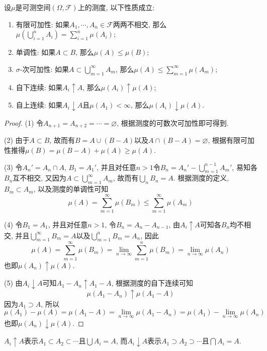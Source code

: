 \documentclass[cn, 12pt, math=mtpro2, bibstyle=apa, blue, twocol]{elegantbook}
\newcommand{\F}{\mathcal{F}}
\newcommand{\limn}{\lim_{n\to\infty}}
\let\emptyset\varnothing
\begin{document}
\begin{theorem}\label{thm:thm1.2}
  设$\mu$是可测空间$(\Omega,\F)$上的测度, 以下性质成立:
  \begin{enumerate}[label=(\arabic*)]
    \item 有限可加性: 如果$A_1,\cdots,A_n\in\F$两两不相交, 那么$\mu(\bigcup_{i=1}^nA_i)=\sum_{i=1}^{n}\mu(A_i)$;
    \item 单调性: 如果$A\subset B$, 那么$\mu(A)\leq \mu(B)$;
    \item $\sigma$-次可加性: 如果$A\subset\bigcup_{m=1}^\infty A_m$, 那么$\mu(A)\leq\sum_{m=1}^{\infty}\mu(A_m)$;
    \item 自下连续: 如果$A_i\uparrow A$, 那么$\mu(A_i)\uparrow \mu(A)$;
    \item 自上连续: 如果$A_i\downarrow A$且$\mu(A_1)<\infty$, 那么$\mu(A_i)\downarrow \mu(A)$.
  \end{enumerate}
\end{theorem}
\begin{proof}
  (1) 令$A_{n+1}=A_{n+2}=\cdots=\emptyset$, 根据测度的可数次可加性即可得到.

  (2) 由于$A\subset B$, 故而有$B=A\cup(B-A)$以及$A\cap (B-A)=\emptyset$, 根据有限可加性推得$\mu(B)=\mu(B-A)+\mu(A)\geq\mu(A)$.

  (3) 令$A_n'=A_n\cap A$, $B_1=A_1'$, 并且对任意$n>1$令$B_n=A_n'-\bigcup_{m=1}^{n-1}A_m'$, 易知各$B_n$互不相交, 又因为$A\subset\bigcup_{m=1}^\infty A_m$, 故而有$\bigcup_n B_n=A$. 根据测度的定义, $B_m\subset A_m$, 以及测度的单调性可知
  $$\mu(A)=\sum_{m=1}^{\infty}\mu(B_m)\leq\sum_{m=1}^{\infty}\mu(A_m)$$

  (4) 令$B_1=A_1$, 并且对任意$n>1$, 令$B_n=A_n-A_{n-1}$, 由$A_i\uparrow A$可知各$B_n$均不相交, 并且$\bigcup_{m=1}^\infty B_m=A$以及$\bigcup_{m=1}^nB_m=A_n$, 因此
  $$\mu(A)=\sum_{m=1}^{\infty}\mu(B_m)=\lim_{n\to\infty}\sum_{m=1}^{n}\mu(B_m)=\limn \mu(A_n)$$
  也即$\mu(A_n)\uparrow \mu(A)$.

  (5) 由$A_i\downarrow A$可知$A_1-A_n\uparrow A_1-A$, 根据测度的自下连续可知
  $$\mu(A_1-A_n)\uparrow \mu(A_1-A)$$
  因为$A_1\supset A$, 所以
  $$\mu(A_1)-\mu(A)=\mu(A_1-A)=\limn \mu(A_1-A_n)=\mu(A_1)-\limn\mu(A_n)$$
  也即$\mu(A_n)\downarrow \mu(A)$.
\end{proof}

\begin{remark}
$A_i\uparrow A$表示$A_1\subset A_2\subset\cdots$且$\bigcup A_i=A$, 而$A_i\downarrow A$表示$A_1\supset A_2\supset\cdots$且$\bigcap A_i=A$.
\end{remark}
\end{document}
